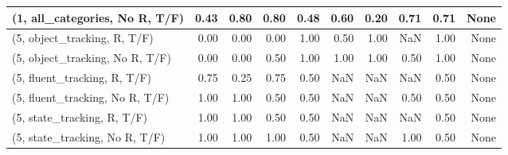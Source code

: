 \begin{table*}[h!]
\begin{adjustbox}{width=2\columnwidth,center}
\begin{tabular}{lrrr|rrr|rrr}
(1, all\_categories, No R, T/F)       &                      0.43 &                  0.80 &                      0.80 &                          0.48 &                      0.60 &                          0.20 &                                   0.71 &                               0.71 &                                  None \\



\midrule
(5, object\_tracking, R, T/F)         &                      0.00 &                  0.00 &                      0.00 &                          1.00 &                      0.50 &                          1.00 &                                    NaN &                               1.00 &                                  None \\
(5, object\_tracking, No R, T/F)      &                      0.00 &                  0.00 &                      0.50 &                          1.00 &                      1.00 &                          1.00 &                                   0.50 &                               1.00 &                                  None \\
(5, fluent\_tracking, R, T/F)         &                      0.75 &                  0.25 &                      0.75 &                          0.50 &                       NaN &                           NaN &                                    NaN &                               0.50 &                                  None \\
(5, fluent\_tracking, No R, T/F)      &                      1.00 &                  1.00 &                      0.50 &                          0.50 &                       NaN &                           NaN &                                   0.50 &                               0.50 &                                  None \\
(5, state\_tracking, R, T/F)          &                      1.00 &                  1.00 &                      0.50 &                          0.50 &                       NaN &                           NaN &                                    NaN &                               0.50 &                                  None \\
(5, state\_tracking, No R, T/F)       &                      1.00 &                  1.00 &                      1.00 &                          0.50 &                       NaN &                           NaN &                                   1.00 &                               0.50 &                                  None \\

\end{tabular}
\end{adjustbox}
\end{table*}

